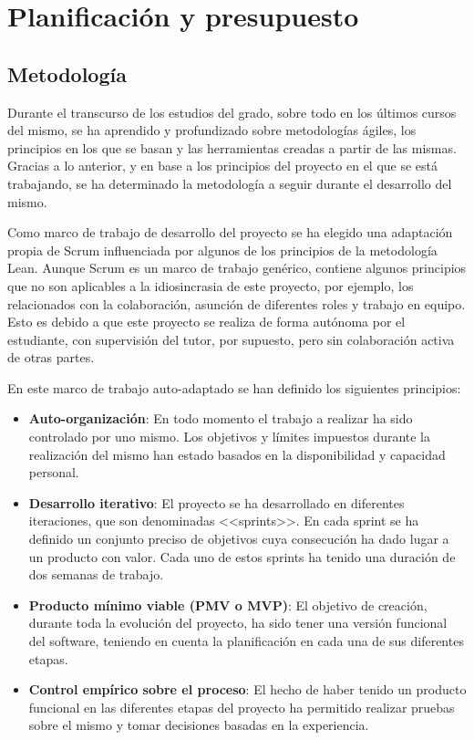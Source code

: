 \chapter{Planificación y presupuesto}
    \label{chap:three}

\section{Metodología}
Durante el transcurso de los estudios del grado, sobre todo en los últimos cursos del mismo, se ha aprendido y profundizado sobre metodologías ágiles, los principios en los que se basan y las herramientas creadas a partir de las mismas. Gracias a lo anterior, y en base a los principios del proyecto en el que se está trabajando, se ha determinado la metodología a seguir durante el desarrollo del mismo.

Como marco de trabajo de desarrollo del proyecto se ha elegido una adaptación propia de Scrum influenciada por algunos de los principios de la metodología Lean. Aunque Scrum es un marco de trabajo genérico, contiene algunos principios que no son aplicables a la idiosincrasia de este proyecto, por ejemplo, los relacionados con la colaboración, asunción de diferentes roles y trabajo en equipo. Esto es debido a que este proyecto se realiza de forma autónoma por el estudiante, con supervisión del tutor, por supuesto, pero sin colaboración activa de otras partes.

En este marco de trabajo auto-adaptado se han definido los siguientes principios:
\begin{itemize}
    \item{\textbf{Auto-organización}}: En todo momento el trabajo a realizar ha sido controlado por uno mismo. Los objetivos y límites impuestos durante la realización del mismo han estado basados en la disponibilidad y capacidad personal.
    \item \textbf{Desarrollo iterativo}: El proyecto se ha desarrollado en diferentes iteraciones, que son denominadas <<sprints>>. En cada sprint se ha definido un conjunto preciso de objetivos cuya consecución ha dado lugar a un producto con valor. Cada uno de estos sprints ha tenido una duración de dos semanas de trabajo.
    \item \textbf{Producto mínimo viable (PMV o MVP)}: El objetivo de creación, durante toda la evolución del proyecto, ha sido tener una versión funcional del software, teniendo en cuenta la planificación en cada una de sus diferentes etapas.
    \item \textbf{Control empírico sobre el proceso}: El hecho de haber tenido un producto funcional en las diferentes etapas del proyecto ha permitido realizar pruebas sobre el mismo y tomar decisiones basadas en la experiencia.
\end{itemize}

